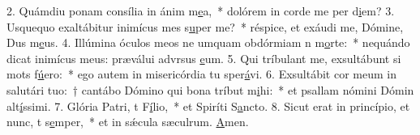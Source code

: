 2. Quámdiu ponam consília in ánim m\uline{e}a,~* dolórem in corde me per d\uline{i}em?
3. Usquequo exaltábitur inimícus mes s\uline{u}per me?~* réspice, et exáudi me, Dómine, Dus m\uline{e}us.
4. Illúmina óculos meos ne umquam obdórmiam n m\uline{o}rte:~* nequándo dicat inimícus meus: præválui advrsus \uline{e}um.
5. Qui tríbulant me, exsultábunt si mots f\uline{ú}ero:~* ego autem in misericórdia tu sper\uline{á}vi.
6. Exsultábit cor meum in salutári tuo:~† cantábo Dómino qui bona tríbut m\uline{i}hi:~* et psallam nómini Dómin alt\uline{í}ssimi.
7. Glória Patri, t F\uline{í}lio,~* et Spiríti S\uline{a}ncto.
8. Sicut erat in princípio, et nunc, t s\uline{e}mper,~* et in sǽcula sæculrum. \uline{A}men.
